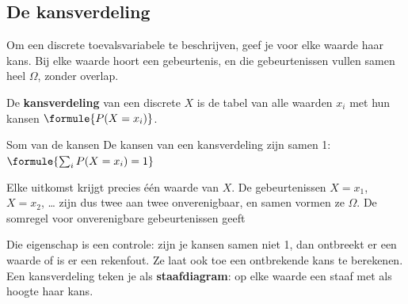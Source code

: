 \subsection{De kansverdeling}

Om een discrete toevalsvariabele te beschrijven, geef je voor elke waarde haar kans. Bij elke waarde hoort een gebeurtenis, en die gebeurtenissen vullen samen heel $\Omega$, zonder overlap.

\begin{theorie}
De \textbf{\textcolor{accent}{kansverdeling}} van een discrete $X$ is de tabel van alle waarden $x_i$ met hun kansen $\formule{P(X = x_i)}$.

\begin{stelling}{Som van de kansen}
De kansen van een kansverdeling zijn samen 1: \quad $\formule{\sum_i P(X = x_i) = 1}$
\end{stelling}

\begin{bewijs}
Elke uitkomst krijgt precies één waarde van $X$. De gebeurtenissen $X = x_1$, $X = x_2$, \ldots{} zijn dus twee aan twee onverenigbaar, en samen vormen ze $\Omega$. De somregel voor onverenigbare gebeurtenissen geeft
\end{bewijs}
\end{theorie}

Die eigenschap is een controle: zijn je kansen samen niet 1, dan ontbreekt er een waarde of is er een rekenfout. Ze laat ook toe een ontbrekende kans te berekenen. Een kansverdeling teken je als \textbf{staafdiagram}: op elke waarde een staaf met als hoogte haar kans.


